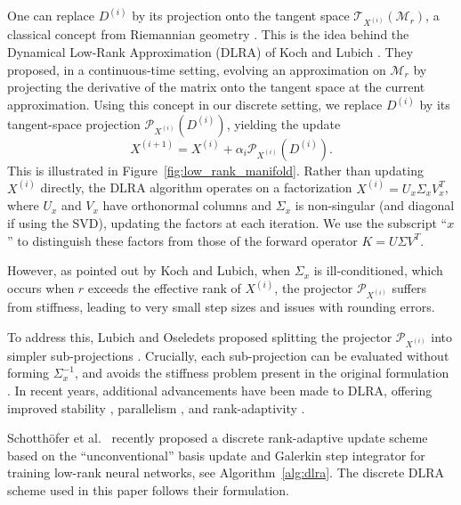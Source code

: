 One can replace $D^{(i)}$ by its projection onto the tangent space $\mathcal{T}_{X^{(i)}}(\mathcal{M}_r)$, a classical concept from Riemannian geometry \cite{docarmoRiemannianGeometry1992,absilOptimizationAlgorithmsMatrix2008}. This is the idea behind the Dynamical Low-Rank Approximation (DLRA) of Koch and Lubich \cite{kochDynamicalLowrankApproximation2007}. They proposed, in a continuous-time setting, evolving an approximation on $\mathcal{M}_r$ by projecting the derivative of the matrix onto the tangent space at the current approximation. Using this concept in our discrete setting, we replace $D^{(i)}$ by its tangent-space projection $\mathcal{P}_{X^{(i)}}(D^{(i)})$, yielding the update
\begin{equation*}
    X^{(i+1)} = X^{(i)} 
    + \alpha_i \mathcal{P}_{X^{(i)}}(D^{(i)}).
\end{equation*}
This is illustrated in Figure~\ref{fig:low_rank_manifold}. Rather than updating $X^{(i)}$ directly, the DLRA algorithm operates on a factorization $X^{(i)} = U_x \Sigma_x V_x^T$, where $U_x$ and $V_x$ have orthonormal columns and $\Sigma_x$ is non-singular (and diagonal if using the SVD), updating the factors at each iteration. We use the subscript ``$x$'' to distinguish these factors from those of the forward operator $K = U \Sigma V^T$.

However, as pointed out by Koch and Lubich, when $\Sigma_x$ is ill-conditioned, which occurs when $r$ exceeds the effective rank of $X^{(i)}$, the projector $\mathcal{P}_{X^{(i)}}$ suffers from stiffness, leading to very small step sizes and issues with rounding errors.

To address this, Lubich and Oseledets proposed splitting the projector $\mathcal{P}_{X^{(i)}}$ into simpler sub-projections \cite{lubichProjectorsplittingIntegratorDynamical2013}. Crucially, each sub-projection can be evaluated without forming $\Sigma_x^{-1}$, and avoids the stiffness problem present in the original formulation \cite{kieriDiscretizedDynamicalLowrank2016}. In recent years, additional advancements have been made to DLRA, offering improved stability \cite{kuschStabilityRobustDynamical2023a}, parallelism \cite{cerutiParallelRankadaptiveIntegrator2024}, and rank-adaptivity \cite{cerutiRankadaptiveRobustIntegrator2021}.

Schotthöfer et al.\ \cite{schotthoferLowrankLotteryTickets2022} recently proposed a discrete rank-adaptive update scheme based on the ``unconventional'' basis update and Galerkin step integrator \cite{cerutiUnconventionalRobustIntegrator2020} for training low-rank neural networks, see Algorithm~\ref{alg:dlra}. The discrete DLRA scheme used in this paper follows their formulation.



